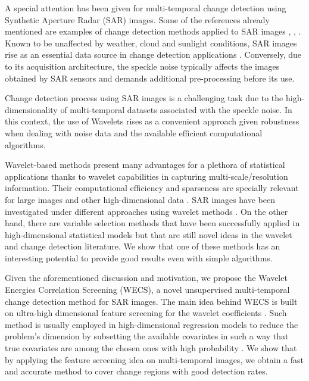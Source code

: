 \documentclass[journal]{IEEEtran}
\begin{document}
A special attention has been given for multi-temporal change detection using Synthetic Aperture Radar (SAR) images. 
Some of the references already mentioned are examples of change detection methods applied to SAR images \cite{barreto2016deforestation,ban2012multitemporal,scher2021mapping,quin2014mimosa}, \cite{jia2018novel}, \cite{hou2014unsupervised}. Known to be unaffected by weather, cloud and sunlight conditions, SAR images rise as an essential data source in change detection applications \cite{bovolo2005detail}. Conversely, due to its acquisition architecture, the speckle noise typically affects the images obtained by SAR sensors and demands additional pre-processing before its use.

Change detection process using SAR images is a challenging task due to the high-dimensionality of multi-temporal datasets associated with the speckle noise. In this context, the use of Wavelets rises as a convenient approach given robustness when dealing with noise data and the available efficient computational algorithms.

Wavelet-based methods present many advantages for a plethora of statistical applications \cite{vidakovic1999statistical} thanks to wavelet capabilities in capturing multi-scale/resolution information. 
Their computational efficiency and sparseness are specially relevant for large images and other high-dimensional data \cite{morettin2017wavelets}. 
SAR images have been investigated under different approaches using wavelet methods \cite{atto2012multidate,bouhlel2015multivariate,celik2009multiscale,cui2012statistical}. 
On the other hand, there are variable selection methods that have been successfully applied in high-dimensional statistical models but that are still novel ideas in the wavelet and change detection literature. We show that one of these methods has an interesting potential to provide good results even with simple algorithms.


Given the aforementioned discussion and motivation, we propose the Wavelet Energies Correlation Screening (WECS), a novel unsupervised multi-temporal change detection method for SAR images.
%
The main idea behind WECS is built on ultra-high dimensional feature screening for the wavelet coefficients \cite{fan2020statistical}. Such method is usually employed in high-dimensional regression models to reduce the problem's dimension by subsetting the available covariates in such a way that true covariates are among the chosen ones with high probability \cite{fan2008sure}. We show that by applying the feature screening idea on multi-temporal images, we obtain a fast and accurate method to cover change regions with good detection rates.
\end{document}

